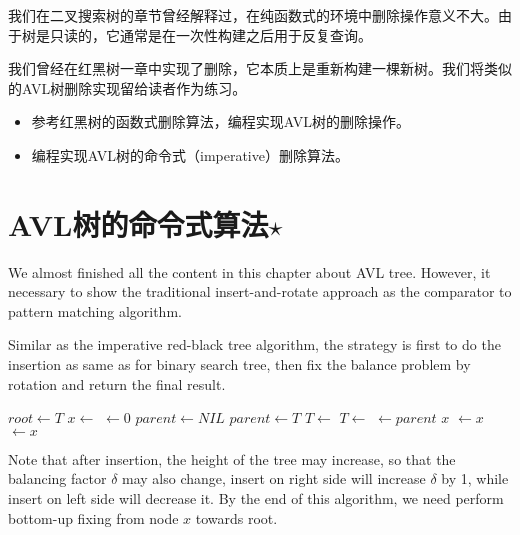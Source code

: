\documentclass[UTF8]{article}
\begin{document}
我们在二叉搜索树的章节曾经解释过，在纯函数式的环境中删除操作意义不大。由于树是只读的，它通常是在一次性构建之后用于反复查询。

我们曾经在红黑树一章中实现了删除，它本质上是重新构建一棵新树。我们将类似的AVL树删除实现留给读者作为练习。

\begin{Exercise}

\begin{itemize}
\item 参考红黑树的函数式删除算法，编程实现AVL树的删除操作。

\item 编程实现AVL树的命令式（imperative）删除算法。
\end{itemize}

\end{Exercise}

\section{AVL树的命令式算法$\star$}

We almost finished all the content in this chapter about AVL tree.
However, it necessary to show the traditional insert-and-rotate
approach as the comparator to pattern matching algorithm.

Similar as the imperative red-black tree algorithm, the strategy
is first to do the insertion as same as for binary search tree,
then fix the balance problem by rotation and return the final result.

\begin{algorithmic}[1]
  \State $root \gets T$
  \State $x \gets$ 
  \State {} $\gets 0$
  \State $parent \gets NIL$
    \State $parent \gets T$
      \State $T \gets $ 
    \Else
      \State $T \gets $ 
    \EndIf
  \EndWhile
  \State {} $\gets parent$
   
    \State \Return $x$
    \State {} $\gets x$
  \Else
    \State {} $\gets x$
  \EndIf
  \State \Return {}
\EndFunction
\end{algorithmic}

Note that after insertion, the height of the tree may increase, so that
the balancing factor $\delta$ may also change, insert on right side will
increase $\delta$ by 1, while insert on left side will decrease it. By
the end of this algorithm, we need perform bottom-up fixing from node $x$
towards root.
\end{document}
